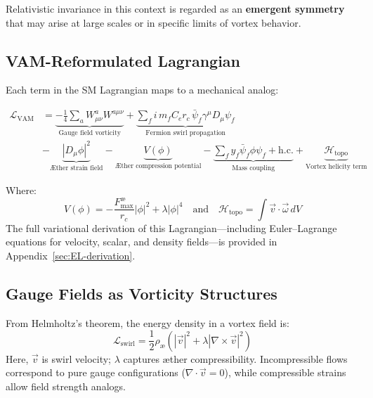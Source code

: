 Relativistic invariance in this context is regarded as an \textbf{emergent symmetry} that may arise at large scales or in specific limits of vortex behavior.

\subsection*{VAM-Reformulated Lagrangian}
Each term in the SM Lagrangian maps to a mechanical analog:

\begin{align*}
    \mathcal{L}_\text{VAM} &= \underbrace{-\frac{1}{4} \sum_{a} W^{a}_{\mu\nu} W^{a\mu\nu}}_{\text{Gauge field vorticity}}
    + \underbrace{\sum_{f} i \, m_f C_e r_c \, \bar{\psi}_f \gamma^\mu D_\mu \psi_f}_{\text{Fermion swirl propagation}} \\
    &- \underbrace{|D_\mu \phi|^2}_{\text{Æther strain field}}
    - \underbrace{V(\phi)}_{\text{Æther compression potential}}
    - \underbrace{\sum_f y_f \bar{\psi}_f \phi \psi_f + \text{h.c.}}_{\text{Mass coupling}}
    + \underbrace{\mathcal{H}_\text{topo}}_{\text{Vortex helicity term}}
\end{align*}

Where:
\[
    V(\phi) = -\frac{F^{\text{\ae}}_{\text{max}}}{r_c}|\phi|^2 + \lambda |\phi|^4
    \quad \text{and} \quad \mathcal{H}_\text{topo} = \int \vec{v} \cdot \vec{\omega} \, dV
\]
The full variational derivation of this Lagrangian—including Euler–Lagrange equations for velocity, scalar, and density fields—is provided in Appendix~\ref{sec:EL-derivation}.

\subsection{Gauge Fields as Vorticity Structures}
From Helmholtz’s theorem, the energy density in a vortex field is:
\begin{equation}
    \mathcal{L}_{\text{swirl}} = \frac{1}{2} \rho_\text{\ae} \left( |\vec{v}|^2 + \lambda |\nabla \times \vec{v}|^2 \right)
\end{equation}
Here, $\vec{v}$ is swirl velocity; $\lambda$ captures æther compressibility. Incompressible flows correspond to pure gauge configurations ($\nabla \cdot \vec{v} = 0$), while compressible strains allow field strength analogs.

